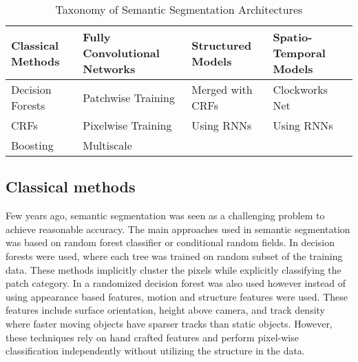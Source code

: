 \documentclass[conference]{IEEEtran}
\begin{document}
\begin{table*}[ht!]
\centering
\caption{Taxonomy of Semantic Segmentation Architectures}
\label{table:taxonomy}
\begin{tabular}{|l|l|l|l|}
\hline
\textbf{Classical Methods} & \textbf{Fully Convolutional Networks}                                                 & \textbf{Structured Models} & \textbf{Spatio-Temporal Models} \\ \hline
Decision Forests \cite{shotton2008semantic}\cite{brostow2008segmentation} & Patchwise Training \cite{farabet2013learning}\cite{farabet2012scene}\cite{grangier2009deep} & Merged with CRFs \cite{lin2015efficient}\cite{chen2016deeplab}\cite{zheng2015conditional} & Clockworks Net \cite{ShelhamerRHD16}\\ \hline

CRFs \cite{sturgess2009combining}\cite{russell2009associative} & Pixelwise Training \cite{long2015fully}\cite{noh2015learning}\cite{badrinarayanan2015segnet} & Using RNNs \cite{visin2016reseg} &  Using RNNs \cite{FayyazSSFK16}\cite{siam2016convolutional}\cite{nilsson2016semantic}\\ \hline

Boosting \cite{sturgess2009combining}\cite{shotton2006textonboost} & Multiscale \cite{yu2015multi}\cite{farabet2013learning}\cite{noh2015learning}\cite{chen2015attention}\cite{Qi_2016_CVPR}\cite{ronneberger2015u} &  & \\ \hline
\end{tabular}
\end{table*}\subsection{Classical methods}
Few years ago, semantic segmentation was seen as a challenging problem to achieve reasonable accuracy. The main approaches used in semantic segmentation was based on random forest classifier or conditional random fields. In \cite{shotton2008semantic} decision forests were used, where each tree was trained on random subset of the training data. These methods implicitly cluster the pixels while explicitly classifying the patch category. In \cite{brostow2008segmentation} a randomized decision forest was also used however instead of using appearance based features, motion and structure features were used. These features include surface orientation, height above camera, and track density where faster moving objects have sparser tracks than static objects. However, these techniques rely on hand crafted features and perform pixel-wise classification independently without utilizing the structure in the data. 
\end{document}
